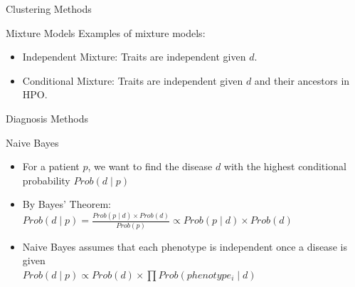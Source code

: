 \documentclass[final]{beamer} %
\begin{document}
\begin{frame}{}
\begin{columns}[T]
\begin{column}{0.3\linewidth}
\begin{block}{\Huge Clustering Methods}
\begin{block}{\Large Mixture Models}
       Examples of mixture models:
       \begin{itemize}
       \item Independent Mixture: Traits are independent given $d$.
       \item Conditional Mixture: Traits are independent given $d$ and
         their ancestors in HPO.
       \end{itemize}
     \end{block}
   \end{block}
   \vspace{3cm}

   \begin{block}{\Huge Diagnosis Methods}
   
     \begin{block}{\Large Naive Bayes}
       \begin{itemize}
         \Large
       \item For a patient $p$, we want to find the disease $d$ with
         the highest conditional probability $Prob(d \mid p )$
         \vspace{1cm}
       \item
         By Bayes' Theorem: \\
         $Prob(d \mid p) = \frac{Prob(p \mid d) \times
           Prob(d)}{Prob(p)} \propto Prob(p \mid d) \times Prob(d)$
         \vspace{1cm}
       \item
         Naive Bayes assumes that each phenotype is independent once a disease is given \\
         $Prob(d \mid p) \propto Prob(d) \times \prod Prob(phenotype_i
         \mid d)$
       \end{itemize}
     \end{block}
     \vspace{1cm}


\end{block}
\end{column}
\end{columns}
\end{frame}
\end{document}
